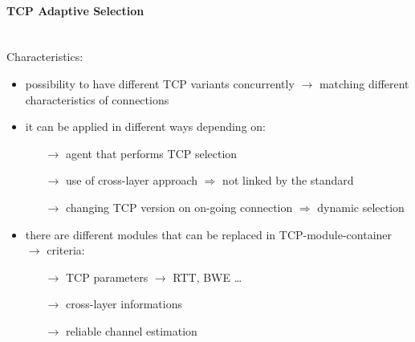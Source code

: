 \paragraph{TCP Adaptive Selection}\mbox{}\\[0.2cm]
Characteristics:
\begin{itemize}
    \item possibility to have different TCP variants concurrently
    $\rightarrow$ matching different characteristics of connections
    \item it can be applied in different ways depending on:
    \begin{itemize}
        \item[$\rightarrow$] agent that performs TCP selection
        \item[$\rightarrow$] use of cross-layer approach $\Rightarrow$ not linked by the standard
        \item[$\rightarrow$] changing TCP version on on-going connection $\Rightarrow$ dynamic selection
    \end{itemize}
    \item there are different modules that can be replaced in TCP-module-container\\
    $\rightarrow$ criteria:
    \begin{itemize}
        \item[$\rightarrow$] TCP parameters $\rightarrow$ RTT, BWE \dots
        \item[$\rightarrow$] cross-layer informations
        \item[$\rightarrow$] reliable channel estimation
    \end{itemize}
\end{itemize}

